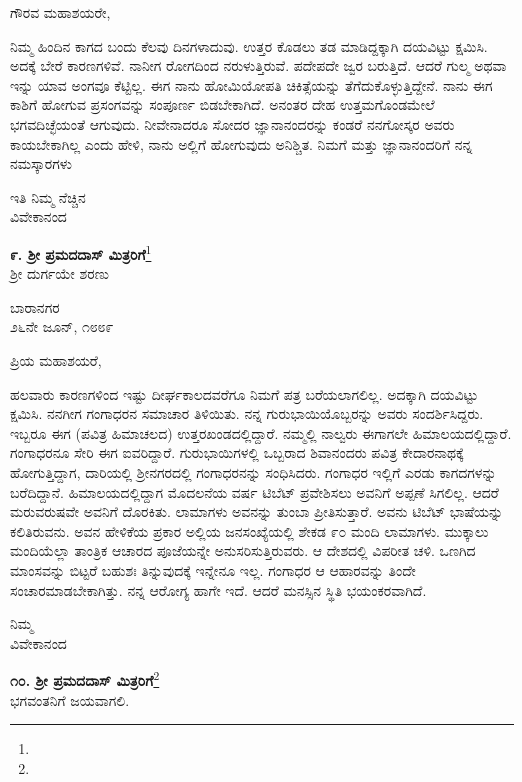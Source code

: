 \noindent
ಗೌರವ ಮಹಾಶಯರೇ,

ನಿಮ್ಮ ಹಿಂದಿನ ಕಾಗದ ಬಂದು ಕೆಲವು ದಿನಗಳಾದುವು. ಉತ್ತರ ಕೊಡಲು ತಡ ಮಾಡಿದ್ದಕ್ಕಾಗಿ ದಯವಿಟ್ಟು ಕ್ಷಮಿಸಿ. ಅದಕ್ಕೆ ಬೇರೆ ಕಾರಣಗಳಿವೆ. ನಾನೀಗ ರೋಗದಿಂದ ನರುಳುತ್ತಿರುವೆ. ಪದೇಪದೇ ಜ್ವರ ಬರುತ್ತಿದೆ. ಆದರೆ ಗುಲ್ಮ ಅಥವಾ ಇನ್ನು ಯಾವ ಅಂಗವೂ ಕೆಟ್ಟಿಲ್ಲ. ಈಗ ನಾನು ಹೋಮಿಯೋಪತಿ ಚಿಕಿತ್ಸೆಯನ್ನು ತೆಗೆದುಕೊಳ್ಳುತ್ತಿದ್ದೇನೆ. ನಾನು ಈಗ ಕಾಶಿಗೆ ಹೋಗುವ ಪ್ರಸಂಗವನ್ನು ಸಂಪೂರ್ಣ ಬಿಡಬೇಕಾಗಿದೆ. ಅನಂತರ ದೇಹ ಉತ್ತಮಗೊಂಡಮೇಲೆ ಭಗವದಿಚ್ಛೆಯಂತೆ ಆಗುವುದು. ನೀವೇನಾದರೂ ಸೋದರ ಜ್ಞಾನಾನಂದರನ್ನು ಕಂಡರೆ ನನಗೋಸ್ಕರ ಅವರು ಕಾಯಬೇಕಾಗಿಲ್ಲ ಎಂದು ಹೇಳಿ, ನಾನು ಅಲ್ಲಿಗೆ ಹೋಗುವುದು ಅನಿಶ್ಚಿತ. ನಿಮಗೆ ಮತ್ತು ಜ್ಞಾನಾನಂದರಿಗೆ ನನ್ನ ನಮಸ್ಕಾರಗಳು

{\flushright
ಇತಿ ನಿಮ್ಮ ನೆಚ್ಚಿನ\\ವಿವೇಕಾನಂದ\par}

\begin{center}
\textbf{೯. ಶ‍್ರೀ ಪ್ರಮದದಾಸ್ ಮಿತ್ರರಿಗೆ}\footnote{}\\ ಶ‍್ರೀ ದುರ್ಗಯೇ ಶರಣು
\end{center}

\begin{flushright}
ಬಾರಾನಗರ\\೨೬ನೇ ಜೂನ್, ೧೮೮೯
\end{flushright}

\noindent
ಪ್ರಿಯ ಮಹಾಶಯರೆ,

ಹಲವಾರು ಕಾರಣಗಳಿಂದ ಇಷ್ಟು ದೀರ್ಘಕಾಲದವರೆಗೂ ನಿಮಗೆ ಪತ್ರ ಬರೆಯಲಾಗಲಿಲ್ಲ. ಅದಕ್ಕಾಗಿ ದಯವಿಟ್ಟು ಕ್ಷಮಿಸಿ. ನನಗೀಗ ಗಂಗಾಧರನ ಸಮಾಚಾರ ತಿಳಿಯಿತು. ನನ್ನ ಗುರುಭಾಯಿಯೊಬ್ಬರನ್ನು ಅವರು ಸಂದರ್ಶಿಸಿದ್ದರು. ಇಬ್ಬರೂ ಈಗ (ಪವಿತ್ರ ಹಿಮಾಚಲದ) ಉತ್ತರಖಂಡದಲ್ಲಿದ್ದಾರೆ. ನಮ್ಮಲ್ಲಿ ನಾಲ್ವರು ಈಗಾಗಲೇ ಹಿಮಾಲಯದಲ್ಲಿದ್ದಾರೆ. ಗಂಗಾಧರನೂ ಸೇರಿ ಈಗ ಐವರಿದ್ದಾರೆ. ಗುರುಭಾಯಿಗಳಲ್ಲಿ ಒಬ್ಬರಾದ ಶಿವಾನಂದರು ಪವಿತ್ರ ಕೇದಾರನಾಥಕ್ಕೆ ಹೋಗುತ್ತಿದ್ದಾಗ, ದಾರಿಯಲ್ಲಿ ಶ‍್ರೀನಗರದಲ್ಲಿ ಗಂಗಾಧರನನ್ನು ಸಂಧಿಸಿದರು. ಗಂಗಾಧರ ಇಲ್ಲಿಗೆ ಎರಡು ಕಾಗದಗಳನ್ನು ಬರೆದಿದ್ದಾನೆ. ಹಿಮಾಲಯದಲ್ಲಿದ್ದಾಗ ಮೊದಲನೆಯ ವರ್ಷ ಟಿಬೆಟ್ ಪ್ರವೇಶಿಸಲು ಅವನಿಗೆ ಅಪ್ಪಣೆ ಸಿಗಲಿಲ್ಲ. ಆದರೆ ಮರುವರುಷವೇ ಅವನಿಗೆ ದೊರಕಿತು. ಲಾಮಾಗಳು ಅವನನ್ನು ತುಂಬಾ ಪ್ರೀತಿಸುತ್ತಾರೆ. ಅವನು ಟಿಬೆಟ್ ಭಾಷೆಯನ್ನು ಕಲಿತಿರುವನು. ಅವನ ಹೇಳಿಕೆಯ ಪ್ರಕಾರ ಅಲ್ಲಿಯ ಜನಸಂಖ್ಯೆಯಲ್ಲಿ ಶೇಕಡ ೯೦ ಮಂದಿ ಲಾಮಾಗಳು. ಮುಕ್ಕಾಲು ಮಂದಿಯೆಲ್ಲಾ ತಾಂತ್ರಿಕ ಆಚಾರದ ಪೂಜೆಯನ್ನೇ ಅನುಸರಿಸುತ್ತಿರುವರು. ಆ ದೇಶದಲ್ಲಿ ವಿಪರೀತ ಚಳಿ. ಒಣಗಿದ ಮಾಂಸವನ್ನು ಬಿಟ್ಟರೆ ಬಹುಶಃ ತಿನ್ನುವುದಕ್ಕೆ ಇನ್ನೇನೂ ಇಲ್ಲ. ಗಂಗಾಧರ ಆ ಆಹಾರವನ್ನು ತಿಂದೇ ಸಂಚಾರಮಾಡಬೇಕಾಗಿತ್ತು. ನನ್ನ ಆರೋಗ್ಯ ಹಾಗೇ ಇದೆ. ಆದರೆ ಮನಸ್ಸಿನ ಸ್ಥಿತಿ ಭಯಂಕರವಾಗಿದೆ.

{\flushright
ನಿಮ್ಮ\\ವಿವೇಕಾನಂದ\par}

\begin{center}
\textbf{೧೦. ಶ‍್ರೀ ಪ್ರಮದದಾಸ್ ಮಿತ್ರರಿಗೆ}\footnote{}\\ ಭಗವಂತನಿಗೆ ಜಯವಾಗಲಿ.
\end{center}

